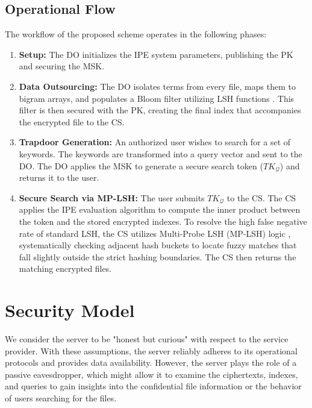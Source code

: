 \subsection{Operational Flow}
The workflow of the proposed scheme operates in the following phases:
\begin{enumerate}
    \item \textbf{Setup:} The DO initializes the IPE system parameters, publishing the PK and securing the MSK.
    \item \textbf{Data Outsourcing:} The DO isolates terms from every file, maps them to bigram arrays, and populates a Bloom filter utilizing LSH functions \cite{wang2014privacy}.%
    This filter is then secured with the PK, creating the final index that accompanies the encrypted file to the CS.%
    \item \textbf{Trapdoor Generation:} An authorized user wishes to search for a set of keywords. The keywords are transformed into a query vector and sent to the DO. The DO applies the MSK to generate a secure search token ($TK_{\mathcal{Q}}$) and returns it to the user.
    \item \textbf{Secure Search via MP-LSH:} The user submits $TK_{\mathcal{Q}}$ to the CS. The CS applies the IPE evaluation algorithm \cite{shen2009predicate} to compute the inner product between the token and the stored encrypted indexes. To resolve the high false negative rate of standard LSH, the CS utilizes Multi-Probe LSH (MP-LSH) logic \cite{lv2007multi}, systematically checking adjacent hash buckets to locate fuzzy matches that fall slightly outside the strict hashing boundaries. The CS then returns the matching encrypted files.%
\end{enumerate}

\section{Security Model}
We consider the server to be "honest but curious" with respect to the service provider.%
With these assumptions, the server reliably adheres to its operational protocols and provides data availability.%
However, the server plays the role of a passive eavesdropper, which might allow it to examine the ciphertexts, indexes, and queries to gain insights into the confidential file information or the behavior of users searching for the files.%

